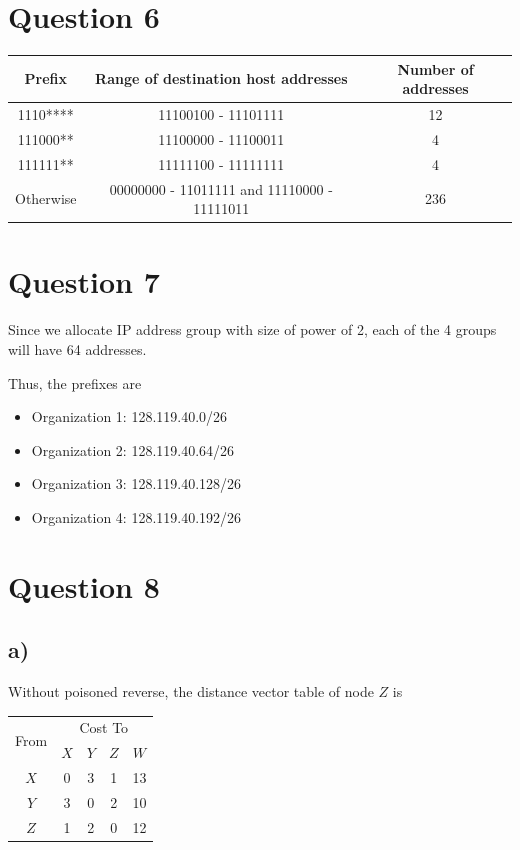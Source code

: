 \documentclass[a4paper,12pt]{article}
\begin{document}
\section*{Question 6}

\begin{table}[H]
  \centering
  \begin{tabular}{ccc}
    \toprule
    Prefix & Range of destination host addresses & Number of addresses \\
    \midrule
    1110**** & 11100100 - 11101111 & 12 \\
    111000** & 11100000 - 11100011 & 4 \\
    111111** & 11111100 - 11111111 & 4 \\
    Otherwise & 00000000 - 11011111 and 11110000 - 11111011 & 236 \\
    \bottomrule
  \end{tabular}
\end{table}

\section*{Question 7}

Since we allocate IP address group with size of power of 2, each of the 4 groups will have 64 addresses.

Thus, the prefixes are
\begin{itemize}
  \item Organization 1: 128.119.40.0/26
  \item Organization 2: 128.119.40.64/26
  \item Organization 3: 128.119.40.128/26
  \item Organization 4: 128.119.40.192/26
\end{itemize}

\section*{Question 8}

\subsection*{a)}

Without poisoned reverse, the distance vector table of node $Z$ is
\begin{table}[H]
  \centering
  \begin{tabular}{ccccc}
    \toprule
    \multirow{2}{*}{From} & \multicolumn{4}{c}{Cost To} \\
    \cmidrule{2-5}
    & $X$ & $Y$ & $Z$ & $W$ \\
    \midrule
    $X$ & 0 & 3 & 1 & 13 \\
    $Y$ & 3 & 0 & 2 & 10 \\
    $Z$ & 1 & 2 & 0 & 12 \\
    \bottomrule
  \end{tabular}
\end{table}
\end{document}
